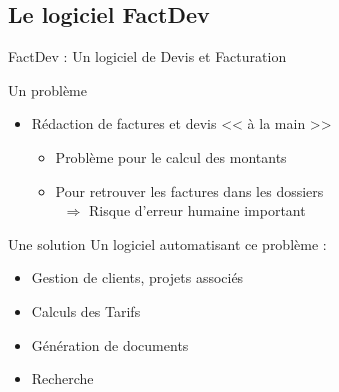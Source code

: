 \documentclass{beamer}
\begin{document}
\subsection{Le logiciel FactDev}
\begin{frame}{FactDev : Un logiciel de Devis et Facturation}
	\begin{block}{Un problème}
		\begin{itemize}
			\item Rédaction de factures et devis << à la main >> 
				\begin{itemize}
			\item Problème pour le calcul des montants
			\item Pour retrouver les factures dans les dossiers\\
				~$\Rightarrow$ Risque d'erreur humaine important
				\end{itemize}
		\end{itemize}
	\end{block}
	\vfill
	\begin{exampleblock}{Une solution}
		Un logiciel automatisant ce problème : 
	\begin{itemize}
		\item Gestion de clients, projets associés
		\item Calculs des Tarifs
		\item Génération de documents 
		\item Recherche
	\end{itemize}
	\end{exampleblock}
\end{frame}
\end{document}
